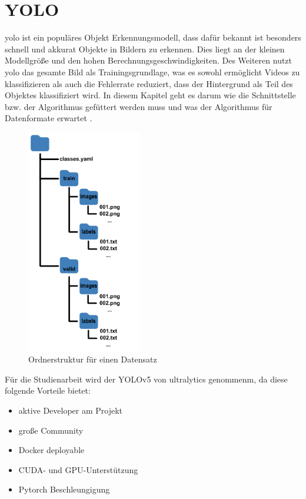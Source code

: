 \chapter{YOLO}
\ac{yolo} ist ein populäres Objekt Erkennungsmodell, dass dafür bekannt ist besonders schnell und akkurat Objekte in Bildern zu erkennen. Dies liegt an der kleinen Modellgröße und den hohen Berechnungsgeschwindigkeiten. Des Weiteren nutzt \ac{yolo} das gesamte Bild als Trainingsgrundlage, was es sowohl ermöglicht Videos zu klassifizieren als auch die Fehlerrate reduziert, dass der Hintergrund als Teil des Objektes klassifiziert wird. In diesem Kapitel geht es darum wie die Schnittstelle bzw. der Algorithmus gefüttert werden muss und was der Algorithmus für Datenformate erwartet \cite{Jiang.2022}.

\begin{figure}
    \includegraphics[width=5cm]{data/img/ordnerstruktur_yolo.png}
    \caption*{Ordnerstruktur für einen Datensatz}
    \label{fig:folderYolo}
\end{figure}

Für die Studienarbeit wird der YOLOv5 von ultralytics \cite{glennjocher.2023} genommenm, da diese folgende Vorteile bietet:
\begin{itemize}
    \item aktive Developer am Projekt
    \item große Community 
    \item Docker deployable
    \item CUDA- und GPU-Unterstützung
    \item Pytorch Beschleungigung
\end{itemize}


